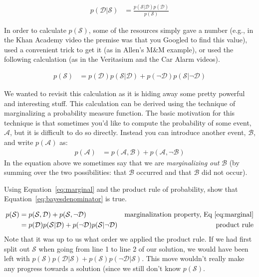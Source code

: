 \documentclass[assignment01_Solutions]{subfiles}
\begin{document}
\begin{align}
p(\mathcal{D} | \mathcal{S}) &= \frac{p(\mathcal{S} | \mathcal{D}) p(\mathcal{D})}{p(\mathcal{S})} \label{eq:bayesdenominator}
\end{align}

In order to calculate $p(\mathcal{S})$, some of the resources simply gave a number (e.g., in the Khan Academy video the premise was that you Googled to find this value), used a convenient trick to get it (as in Allen's M\&M example), or used the following calculation (as in the Veritasium and the Car Alarm videos).

\begin{align}
p(\mathcal{S}) &= p(\mathcal{D}) p(\mathcal{S}|\mathcal{D}) + p(\neg \mathcal{D}) p(\mathcal{S} | \neg \mathcal{D})
\end{align}

We wanted to revisit this calculation as it is hiding away some pretty powerful and interesting stuff.  This calculation can be derived using the technique of marginalizing a probability measure function.  The basic motivation for this technique is that sometimes you'd like to compute the probability of some event, $\mathcal{A}$, but it is difficult to do so directly.  Instead you can introduce another event, $\mathcal{B}$, and write $p(\mathcal{A})$ as:
\begin{align}
p(\mathcal{A}) &= p(\mathcal{A}, \mathcal{B}) + p(\mathcal{A}, \neg \mathcal{B}) \label{eq:marginal}
\end{align}
In the equation above we sometimes say that we are \emph{marginalizing out} $\mathcal{B}$ (by summing over the two possibilities: that $\mathcal{B}$ occurred and that $\mathcal{B}$ did not occur).

\begin{exercise}[(15 minutes)]
Using Equation~\ref{eq:marginal} and the product rule of probability, show that Equation~\ref{eq:bayesdenominator} is true.

\begin{boxedsolution}
\begin{align}
p(\mathcal{S}) &= p(\mathcal{S}, \mathcal{D}) + p(\mathcal{S}, \neg \mathcal{D}) & \mbox{marginalization property, Eq~\ref{eq:marginal}} \nonumber \\
&= p(\mathcal{D})p(\mathcal{S}|\mathcal{D}) + p(\neg \mathcal{D}) p(\mathcal{S} | \neg \mathcal{D})& \mbox{product rule} \nonumber
\end{align}
Note that it was up to us what order we applied the product rule.  If we had first split out $\mathcal{S}$ when going from line 1 to line 2 of our solution, we would have been left with $p(\mathcal{S})p(\mathcal{D}|\mathcal{S}) + p(\mathcal{S}) p(\neg \mathcal{D} | \mathcal{S})$.  This move wouldn't really make any progress towards a solution (since we still don't know $p(\mathcal{S})$.

\end{boxedsolution}
\end{exercise}
\end{document}
